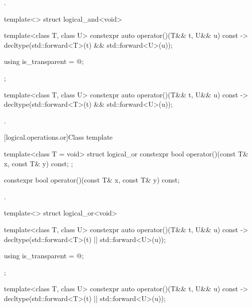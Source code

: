 \begin{itemdescr}
\pnum
\returns
{}.
\end{itemdescr}

%
\begin{itemdecl}
template<> struct logical_and<void> {
  template<class T, class U> constexpr auto operator()(T&& t, U&& u) const
    -> decltype(std::forward<T>(t) && std::forward<U>(u));

  using is_transparent = @\unspec@;
};
\end{itemdecl}

%
\begin{itemdecl}
template<class T, class U> constexpr auto operator()(T&& t, U&& u) const
    -> decltype(std::forward<T>(t) && std::forward<U>(u));
\end{itemdecl}

\begin{itemdescr}
\pnum
\returns
{}.
\end{itemdescr}

[logical.operations.or]{Class template }

%
\begin{itemdecl}
template<class T = void> struct logical_or {
  constexpr bool operator()(const T& x, const T& y) const;
};
\end{itemdecl}

%
\begin{itemdecl}
constexpr bool operator()(const T& x, const T& y) const;
\end{itemdecl}

\begin{itemdescr}
\pnum
\returns
{}.
\end{itemdescr}

%
\begin{itemdecl}
template<> struct logical_or<void> {
  template<class T, class U> constexpr auto operator()(T&& t, U&& u) const
    -> decltype(std::forward<T>(t) || std::forward<U>(u));

  using is_transparent = @\unspec@;
};
\end{itemdecl}

%
\begin{itemdecl}
template<class T, class U> constexpr auto operator()(T&& t, U&& u) const
    -> decltype(std::forward<T>(t) || std::forward<U>(u));
\end{itemdecl}

